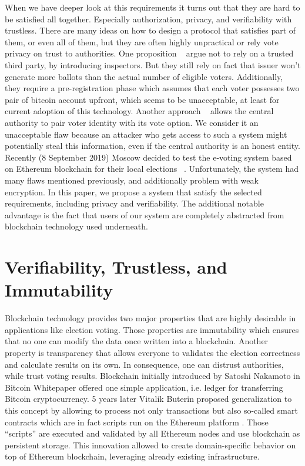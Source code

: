 \documentclass[runningheads]{llncs}
\begin{document}
When we have deeper look at this requirements 
it turns out that they are hard to be satisfied all together. Especially authorization, privacy, and verifiability with trustless. 
% 
There are many ideas on how to design a protocol that satisfies part of them, or even all of them, but they are often highly unpractical or rely vote privacy on trust to authorities. One proposition ~\cite{liu2017voting} argue not to rely on a trusted third party, by introducing inspectors. But they still rely on fact that issuer won't generate more ballots than the actual number of eligible voters. Additionally, they require a pre-registration phase which assumes that each voter possesses two pair of bitcoin account upfront, which seems to be unacceptable, at least for current adoption of this technology. Another approach ~\cite{hardwick2018voting} allows the central authority to pair voter identity with its vote option. We consider it an unacceptable flaw because an attacker who gets access to such a system might potentially steal this information, even if the central authority is an honest entity. Recently (8 September 2019) Moscow decided to test the e-voting system based on Ethereum blockchain for their local elections ~\cite{gaudry2019breaking}. Unfortunately, the system had many flaws mentioned previously, and additionally problem with weak encryption.  
In this paper, we propose a system that satisfy  the selected requirements, including privacy and verifiability. 
The additional notable advantage is the fact that users of our system are completely abstracted from blockchain technology used underneath.



\section{Verifiability, Trustless, and Immutability}
Blockchain technology provides two major properties that are highly desirable in applications like election voting. Those properties are immutability which ensures that no one can modify the data once written into a blockchain. 
Another property is transparency that allows everyone to validates the election correctness and calculate results on its own. In consequence, one can distrust authorities, while trust voting results. 
Blockchain initially introduced by Satoshi Nakamoto in Bitcoin Whitepaper \cite{nakamoto2008bitcoin} 
offered one simple application, i.e. ledger for transferring Bitcoin cryptocurrency. 5 years later Vitalik Buterin proposed generalization to this concept by allowing to process not only transactions but also so-called smart contracts which are in fact scripts run on the Ethereum platform \cite{buterin2013ethereum}. Those “scripts” are executed and validated by all Ethereum nodes and use blockchain as persistent storage. This innovation allowed to create domain-specific behavior on top of Ethereum blockchain, leveraging already existing infrastructure.
\end{document}
